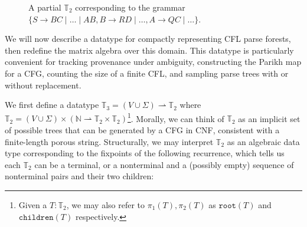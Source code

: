 \documentclass[sigplan,acmsmall,nonacm,screen]{acmart}\settopmatter{printfolios=false,printccs=false,printacmref=false}
\begin{document}
  \begin{figure}
    \vspace{-9pt}
    \caption{A partial $\mathbb{T}_2$ corresponding to the grammar $\{S \rightarrow BC \mid \ldots \mid AB, B\rightarrow RD \mid \ldots, A\rightarrow QC \mid \ldots\}$.}
    \label{fig:ptree}
    \vspace{-12pt}
  \end{figure}

  We will now describe a datatype for compactly representing CFL parse forests, then redefine the matrix algebra over this domain. This datatype is particularly convenient for tracking provenance under ambiguity, constructing the Parikh map for a CFG, counting the size of a finite CFL, and sampling parse trees with or without replacement.

  We first define a datatype $\mathbb{T}_3 = (V \cup \Sigma) \rightharpoonup \mathbb{T}_2$ where $\mathbb{T}_2 = (V \cup \Sigma) \times (\mathbb{N} \rightharpoonup \mathbb{T}_2\times\mathbb{T}_2)$\footnote{Given a $T:\mathbb{T}_2$, we may also refer to $\pi_1(T), \pi_2(T)$ as $\texttt{root}(T)$ and $\texttt{children}(T)$ respectively.}. Morally, we can think of $\mathbb{T}_2$ as an implicit set of possible trees that can be generated by a CFG in CNF, consistent with a finite-length porous string. Structurally, we may interpret $\mathbb{T}_2$ as an algebraic data type corresponding to the fixpoints of the following recurrence, which tells us each $\mathbb{T}_2$ can be a terminal, or a nonterminal and a (possibly empty) sequence of nonterminal pairs and their two children:\vspace{-10pt}
\end{document}
